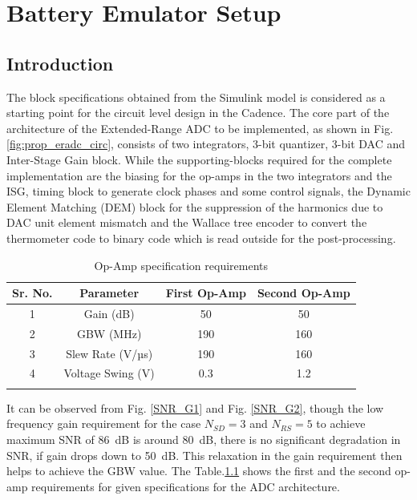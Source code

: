 \chapter{Battery Emulator Setup}

\section{Introduction}
The block specifications obtained from the Simulink model is considered as a starting point for the circuit level design in the Cadence. The core part of the architecture of the Extended-Range ADC to be implemented, as shown in Fig. \ref{fig:prop_eradc_circ}, consists of two integrators, 3-bit quantizer, 3-bit DAC and Inter-Stage Gain block. While the supporting-blocks required for the complete implementation are the biasing for the op-amps in the two integrators and the ISG, timing block to generate clock phases and some control signals, the Dynamic Element Matching (DEM) block for the suppression of the harmonics due to DAC unit element mismatch and the Wallace tree encoder to convert the thermometer code to binary code which is read outside for the post-processing.

%
\begin{table}[h]
\centering
\begin{tabular}{c|c|c|c}
\Xhline{4\arrayrulewidth}
\textbf{Sr. No.} & \textbf{Parameter} & \textbf{First Op-Amp} & \textbf{Second Op-Amp} \\ \hline
1 & Gain (dB) & 50 & 50 \\ \hline 
2 & GBW (MHz) & 190 & 160 \\ \hline
3 & Slew Rate (V/µs) & 190 & 160 \\ \hline
4 & Voltage Swing (V) & 0.3 & 1.2 \\ \Xhline{4\arrayrulewidth}
\end{tabular}
\caption{Op-Amp specification requirements}
\label{tab:opamp_specs}
\end{table}
%
It can be observed from Fig. \ref{SNR_G1} and Fig. \ref{SNR_G2}, though the low frequency gain requirement for the case $N_{SD}=3$ and $N_{RS}=5$ to achieve maximum SNR of 86~dB is around 80~dB, there is no significant degradation in SNR, if gain drops down to 50~dB. This relaxation in the gain requirement then helps to achieve the GBW value. The Table.\ref{tab:opamp_specs} shows the first and the second op-amp requirements for given specifications for the ADC architecture.
